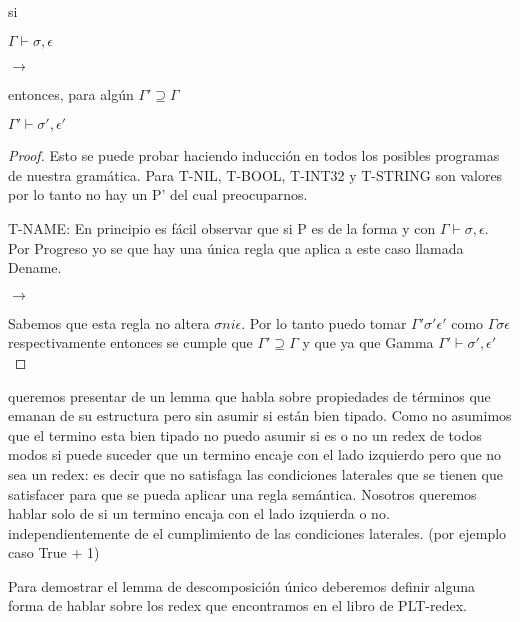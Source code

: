 \begin{theorem}[Preservacion]
    si


    $\Gamma \vdash \sigma, \epsilon$

      $\rightarrow$  

    entonces, para algún $\Gamma' \supseteq  \Gamma$


    $\Gamma' \vdash \sigma', \epsilon'$

\end{theorem}

\begin{proof}
Esto se puede probar haciendo inducción en todos los posibles programas de nuestra
gramática. Para T-NIL, T-BOOL, T-INT32 y T-STRING son valores por lo tanto no hay un P' del cual preocuparnos.

T-NAME: En principio es fácil observar que si P es de la forma  y  con $\Gamma \vdash \sigma, \epsilon$.
Por Progreso yo se que hay una única regla que aplica a este caso llamada Dename.

  $\rightarrow$  

Sabemos que esta regla no altera $\sigma ni \epsilon$.
Por lo tanto puedo tomar $\Gamma' \sigma' \epsilon'$ como $\Gamma \sigma \epsilon$ respectivamente entonces se cumple que $\Gamma' \supseteq  \Gamma$
y que  ya que Gamma $\Gamma' \vdash \sigma', \epsilon'$
\end{proof}

queremos presentar de un lemma que habla sobre propiedades de términos que emanan de su estructura pero sin asumir si están bien tipado.
Como no asumimos que el termino esta bien tipado no puedo asumir si es o no un redex
de todos modos si puede suceder que un termino encaje con el lado izquierdo pero  que no sea un redex:
 es decir que no satisfaga las condiciones laterales que se tienen que satisfacer para que se pueda aplicar una regla semántica.
Nosotros queremos hablar solo de si un termino encaja con el lado izquierda o no. independientemente de el cumplimiento de las condiciones laterales.
(por ejemplo caso True + 1)

Para demostrar el lemma de descomposición único deberemos definir alguna forma de hablar sobre los redex que encontramos en el libro de PLT-redex.

